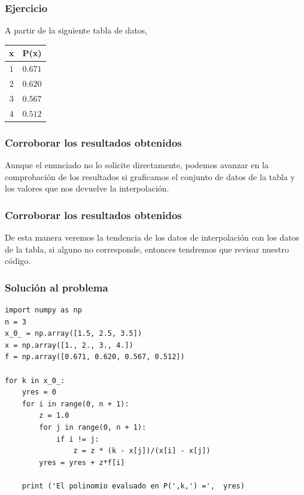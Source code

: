 \begin{frame}
\frametitle{Ejercicio}
\begin{minipage}{5cm}
A partir de la siguiente tabla de datos,
\\
\medskip
\begin{center}
\begin{tabular}{c | c}
x & P(x) \\
\hline $1$ & $0.671$ \\
\hline $2$ & $0.620$ \\
\hline $3$ & $0.567$ \\
\hline $4$ & $0.512$
\end{tabular}
\end{center}
\end{minipage}
\hspace{0.3cm}
\end{frame}
\begin{frame}
\frametitle{Corroborar los resultados obtenidos}
Aunque el enunciado no lo solicite directamente, podemos avanzar en la comprobación de los resultados si graficamos el conjunto de datos de la tabla y los valores que nos devuelve la interpolación.
\end{frame}
\begin{frame}
\frametitle{Corroborar los resultados obtenidos}
De esta manera veremos la tendencia de los datos de interpolación con los datos de la tabla, si alguno no corresponde, entonces tendremos que revisar nuestro código.
\end{frame}
\begin{frame}
\frametitle{Solución al problema}
\begin{lstlisting}[caption=Código para la interpolación de Lagrange,style= FormattedNumber, basicstyle=\linespread{0.9}\ttfamily\small, columns=fullflexible]
import numpy as np
n = 3
x_0_ = np.array([1.5, 2.5, 3.5])
x = np.array([1., 2., 3., 4.])
f = np.array([0.671, 0.620, 0.567, 0.512])

for k in x_0_:
    yres = 0
    for i in range(0, n + 1):
        z = 1.0
        for j in range(0, n + 1):
            if i != j:
                z = z * (k - x[j])/(x[i] - x[j])
        yres = yres + z*f[i]
    
    print ('El polinomio evaluado en P(',k,') =',  yres)
\end{lstlisting}
\end{frame}
